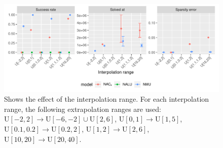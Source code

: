 \begin{figure}[h]
\centering
\includegraphics[width=\linewidth]{results/simple_function_static_range.pdf}
\caption{Shows the effect of the interpolation range. For each interpolation range, the following extrapolation ranges are used: ${\mathrm{U}[-2,2] \rightarrow \mathrm{U}[-6,-2] \cup \mathrm{U}[2,6]}$, ${\mathrm{U}[0,1] \rightarrow \mathrm{U}[1,5]}$, ${\mathrm{U}[0.1,0.2] \rightarrow \mathrm{U}[0.2,2]}$, ${\mathrm{U}[1,2] \rightarrow \mathrm{U}[2,6]}$, ${\mathrm{U}[10, 20] \rightarrow \mathrm{U}[20, 40]}$.}
\label{fig:simple-fnction-static-range}
\end{figure}
